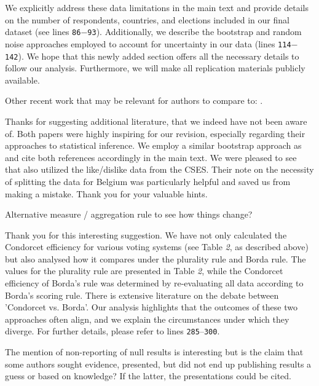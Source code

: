 \documentclass[a4paper, 12pt]{scrartcl}
\theoremstyle{break}
\newenvironment{changes}{\par\color{violet}\par\addvspace{\baselineskip}}{\par\addvspace{\baselineskip}}
\begin{document}
We explicitly address these data limitations in the main text and provide details on the number of respondents, countries, and elections included in our final dataset (see lines \texttt{86$-$93}). Additionally, we describe the bootstrap and random noise approaches employed to account for uncertainty in our data (lines \texttt{114$-$142}). We hope that this newly added section offers all the necessary details to follow our analysis. Furthermore, we will make all replication materials publicly available.

\begin{changes}
Other recent work that may be relevant for authors to compare to: \cite{Desai2025, Darmann2019}.
\end{changes}

Thanks for suggesting additional literature, that we indeed have not been aware of. Both papers were highly inspiring for our revision, especially regarding their approaches to statistical inference. We employ a similar bootstrap approach as \citeauthor{Darmann2019} and cite both references accordingly in the main text.  We were pleased to see that \cite{Desai2025} also utilized the like/dislike data from the CSES. Their note on the necessity of splitting the data for Belgium was particularly helpful and saved us from making a mistake. Thank you for your valuable hints.


\begin{changes}
Alternative measure / aggregation rule to see how things change?
\end{changes}

Thank you for this interesting suggestion. We have not only calculated the Condorcet efficiency for various voting systems (see Table \textit{2}, as described above) but also analysed how it compares under the plurality rule and Borda rule. The values for the plurality rule are presented in Table \textit{2}, while the Condorcet efficiency of  Borda's rule was determined by re-evaluating all data according to Borda's scoring rule. There is extensive literature on the debate between 'Condorcet vs. Borda'. Our analysis highlights that the outcomes of these two approaches often align, and we explain the circumstances under which they diverge. For further details, please refer to lines \texttt{285$–$300}. 

\begin{changes}
The mention of non-reporting of null results is interesting but is the claim that some authors sought evidence, presented, but did not end up publishing results a guess or based on knowledge? If the latter, the presentations could be cited.
\end{changes}
\end{document}
